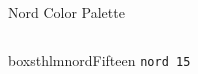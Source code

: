 \documentclass[aspectratio=169, sectionpages]{beamer}
\begin{document}
\begin{frame}[c]{Nord Color Palette}
\begin{columns}[t]
\begin{column}{0.25\textwidth}
			\vspace{0.5em}

			\begin{beamercolorbox}[rounded=true, center, wd=\textwidth,ht=2ex,dp=1ex]{boxsthlmnordFifteen}
				\texttt{nord 15}
			\end{beamercolorbox}

		\end{column}

	\end{columns}
\end{frame}

\end{document}
